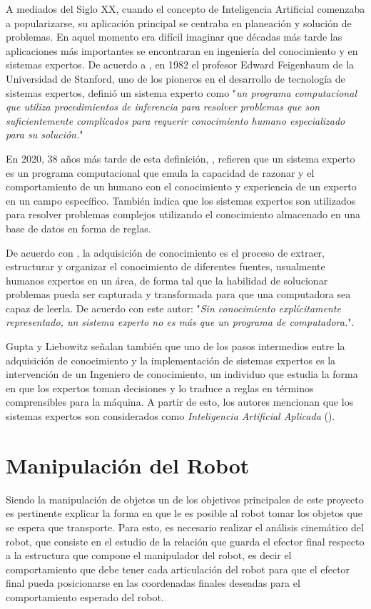 A mediados del Siglo XX, cuando el concepto de Inteligencia Artificial comenzaba a popularizarse, su aplicación principal se centraba en planeación y solución de problemas. En aquel momento era difícil imaginar que décadas más tarde las aplicaciones más importantes se encontraran en ingeniería del conocimiento y en sistemas expertos. De acuerdo a \cite{giarratano_zhuan_2002}, en 1982 el profesor Edward Feigenbaum de la Universidad de Stanford, uno de los pioneros en el desarrollo de tecnología de sistemas expertos, definió un sistema experto como "\textit{un programa computacional que utiliza procedimientos de inferencia para resolver problemas que son suficientemente complicados para requerir conocimiento humano especializado para su solución.}"

En 2020, 38 años más tarde de esta definición, \cite{gupta_artificial_2020}, refieren que un sistema experto es un programa computacional que emula la capacidad de razonar y el comportamiento de un humano con el conocimiento y experiencia de un experto en un campo específico. También indica que los sistemas expertos son utilizados para resolver problemas complejos utilizando el conocimiento almacenado en una base de datos en forma de reglas. 

De acuerdo con \cite{liebowitz_handbook_2019}, la adquisición de conocimiento es el proceso de extraer, estructurar y organizar el conocimiento de diferentes fuentes, usualmente humanos expertos en un área, de forma tal que la habilidad de solucionar problemas pueda ser capturada y transformada para que una computadora sea capaz de leerla. De acuerdo con este autor: "\textit{Sin conocimiento explícitamente representado, un sistema experto no es más que un programa de computadora.}". 

Gupta y Liebowitz señalan también que uno de los pasos intermedios entre la adquisición de conocimiento y la implementación de sistemas expertos es la intervención de un Ingeniero de conocimiento, un individuo que estudia la forma en que los expertos toman decisiones y lo traduce a reglas en términos comprensibles para la máquina. A partir de esto, los autores mencionan que los sistemas expertos son considerados como \textit{Inteligencia Artificial Aplicada} (\cite*{gupta_artificial_2020}). 

\section{Manipulación del Robot}
Siendo la manipulación de objetos un de los objetivos principales de este proyecto es pertinente explicar la forma en que le es posible al robot tomar los objetos que se espera que transporte. Para esto, es necesario realizar el análisis cinemático del robot, que consiste en el estudio de la relación que guarda el efector final respecto a la estructura que compone el manipulador del robot, es decir el comportamiento que debe tener cada articulación del robot para que el efector final pueda posicionarse en las coordenadas finales deseadas para el comportamiento esperado del robot.

